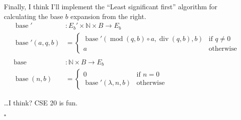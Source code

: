 \documentclass[a5paper, fleqn]{article}
\DeclareMathOperator{\Div}{div}
\DeclareMathOperator{\Mod}{mod}
\DeclareMathOperator{\base}{base}
\newcommand{\nat}{\mathbb{N}}
\begin{document}
Finally, I think I'll implement the ``Least significant first'' algorithm for
calculating the base $b$ expansion from the right.
\begin{align*}
  \base'          & : E_b' \times \nat \times B \to E_b           \\
  \base'(a, q, b) & = \begin{cases}
                        \base'(\Mod(q, b) \circ a, \Div(q, b), b) &
                        \text{if } q \neq 0                         \\
                        a                                         &
                        \text{otherwise}
                      \end{cases} \\
  \\
  \base           & : \nat \times B \to E_b                       \\
  \base(n, b)     & = \begin{cases}
                        0                     & \text{if } n = 0 \\
                        \base'(\lambda, n, b) & \text{otherwise}
                      \end{cases}
\end{align*}

\dots I think? CSE 20 is fun.

\hfill{$\square$}
\end{document}
